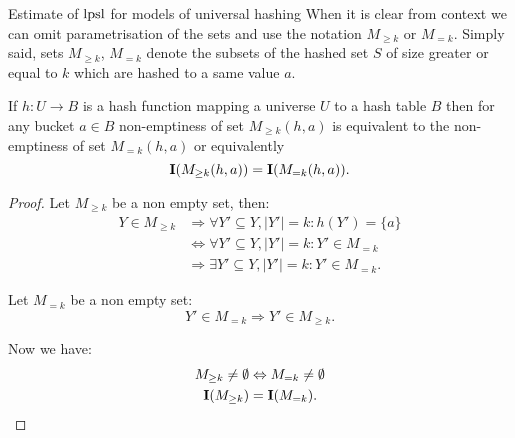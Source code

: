 \begin{section}{Estimate of $\mathrm{lpsl}$ for models of universal hashing}
When it is clear from context we can omit parametrisation of the sets and use the notation $M_{\geq k}$ or $M_{= k}$. Simply said, sets $M_{\geq k}$, $M_{= k}$ denote the subsets of the hashed set $S$ of size greater or equal to $k$ which are hashed to a same value $a$. 

\begin{lemma}
\label{lemma-indicator-k-collision}
If $h: U \rightarrow B$ is a hash function mapping a universe $U$ to a hash table $B$ then for any bucket $a \in B$ non-emptiness of set $M_{\geq k}(h, a)$ is equivalent to the non-emptiness of set $M_{= k}(h, a)$ or equivalently
\begin{displaymath}
\mathbf{I}(M_{\geq k}(h, a)) = \mathbf{I}(M_{= k}(h, a)) \text{.}
\end{displaymath}
\begin{proof}
Let $M_{\geq k}$ be a non empty set, then:
\begin{displaymath}
\begin{split}
Y \in M_{\geq k} 
	& \Rightarrow \forall Y' \subseteq Y, |Y'| = k: h(Y') = \{a\} \\
	& \Leftrightarrow \forall Y' \subseteq Y, |Y'| = k: Y' \in M_{=k} \\
	& \Rightarrow \exists Y' \subseteq Y, |Y'| = k: Y' \in M_{=k} \text{.}
\end{split}
\end{displaymath}

Let $M_{=k}$ be a non empty set:
\begin{displaymath}
Y' \in M_{=k} \Rightarrow Y' \in M_{\geq k} \text{.}
\end{displaymath}

Now we have:
\begin{displaymath}
\begin{split}
M_{\geq k} \neq \emptyset & \Leftrightarrow  M_{= k} \neq \emptyset \\
\mathbf{I}(M_{\geq k}) & = \mathbf{I}(M_{= k}) \text{.}
\end{split}
\end{displaymath}
\end{proof}
\end{lemma}


\end{section}
